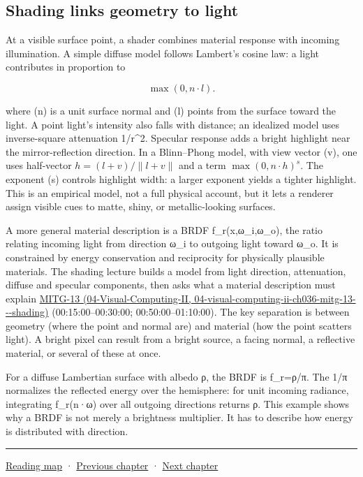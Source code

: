 \subsection{Shading links geometry to light}\label{03-visual-computing-i-ch006-shading-links-geometry-to-light}

At a visible surface point, a shader combines material response with incoming illumination. A simple diffuse model follows Lambert's cosine law: a light contributes in proportion to

\[
\max(0,n\cdot l).
\]

where (n) is a unit surface normal and (l) points from the surface toward the light. A point light's intensity also falls with distance; an idealized model uses inverse-square attenuation 1/r\^{}2. Specular response adds a bright highlight near the mirror-reflection direction. In a Blinn--Phong model, with view vector (v), one uses half-vector \(h=(l+v)/\|l+v\|\) and a term \(\max(0,n\cdot h)^s\). The exponent (s) controls highlight width: a larger exponent yields a tighter highlight. This is an empirical model, not a full physical account, but it lets a renderer assign visible cues to matte, shiny, or metallic-looking surfaces.

A more general material description is a BRDF f\_r(x,ω\_i,ω\_o), the ratio relating incoming light from direction ω\_i to outgoing light toward ω\_o. It is constrained by energy conservation and reciprocity for physically plausible materials. The shading lecture builds a model from light direction, attenuation, diffuse and specular components, then asks what a material description must explain \href{../04-Visual-Computing-II/main.pdf\#nameddest=04-visual-computing-ii-ch036-mitg-13---shading}{MITG-13 (04-Visual-Computing-II, 04-visual-computing-ii-ch036-mitg-13-\/-\/-shading)} (00:15:00--00:30:00; 00:50:00--01:10:00). The key separation is between geometry (where the point and normal are) and material (how the point scatters light). A bright pixel can result from a bright source, a facing normal, a reflective material, or several of these at once.

For a diffuse Lambertian surface with albedo ρ, the BRDF is f\_r=ρ/π. The 1/π normalizes the reflected energy over the hemisphere: for unit incoming radiance, integrating f\_r(n·ω) over all outgoing directions returns ρ. This example shows why a BRDF is not merely a brightness multiplier. It has to describe how energy is distributed with direction.

\begin{center}\rule{0.5\linewidth}{0.5pt}\end{center}

\hyperref[volume-reading-map]{Reading map} · \hyperref[03-visual-computing-i-ch005]{Previous chapter} · \hyperref[03-visual-computing-i-ch007]{Next chapter}

